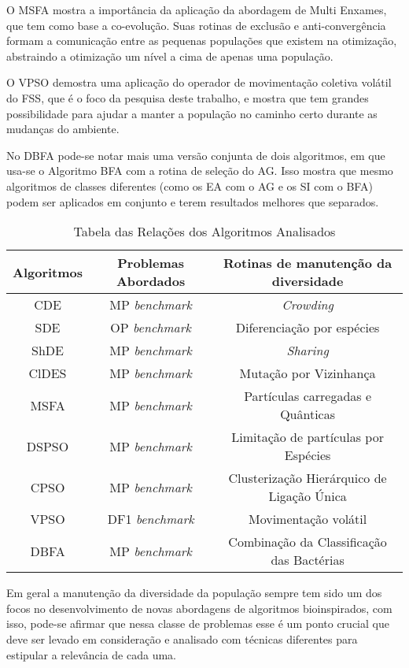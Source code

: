 O MSFA mostra a importância da aplicação da abordagem de Multi Enxames, que tem como base a co-evolução. Suas rotinas de exclusão e anti-convergência formam a comunicação entre as pequenas populações que existem na otimização, abstraindo a otimização um nível a cima de apenas uma população.

O VPSO demostra uma aplicação do operador de movimentação coletiva volátil do FSS, que é o foco da pesquisa deste trabalho, e mostra que tem grandes possibilidade para ajudar a manter a população no caminho certo durante as mudanças do ambiente.

No DBFA pode-se notar mais uma versão conjunta de dois algoritmos, em que usa-se o Algoritmo BFA com a rotina de seleção do AG. Isso mostra que mesmo algoritmos de classes diferentes (como os EA com o AG e os SI com o BFA) podem ser aplicados em conjunto e terem resultados melhores que separados.

\begin{table}[]
	\label{tab:problems_table}
	\centering
	\caption{Tabela das Relações dos Algoritmos Analisados}
	\label{my-label}
	\begin{tabular}{|c|c|c|}
		\hline
		Algoritmos & Problemas Abordados & Rotinas de manutenção da diversidade \\ \hline
		CDE        & MP \textit{benchmark}   & \textit{Crowding} \\ \hline
		SDE        & OP \textit{benchmark}   & Diferenciação por espécies \\ \hline
		ShDE       & MP \textit{benchmark}   & \textit{Sharing} \\ \hline
		ClDES      & MP \textit{benchmark}   & Mutação por Vizinhança \\ \hline
		MSFA       & MP \textit{benchmark}   & Partículas carregadas e Quânticas \\ \hline
		DSPSO      & MP \textit{benchmark}   & Limitação de partículas por Espécies \\ \hline
		CPSO       & MP \textit{benchmark}   & Clusterização Hierárquico de Ligação Única \\ \hline
		VPSO       & DF1 \textit{benchmark}  & Movimentação volátil \\ \hline
		DBFA       & MP \textit{benchmark}   & Combinação da Classificação das Bactérias \\ \hline
	\end{tabular}
\end{table}

Em geral a manutenção da diversidade da população sempre tem sido um dos focos no desenvolvimento de novas abordagens de algoritmos bioinspirados, com isso, pode-se afirmar que nessa classe de problemas esse é um ponto crucial que deve ser levado em consideração e analisado com técnicas diferentes para estipular a relevância de cada uma.
